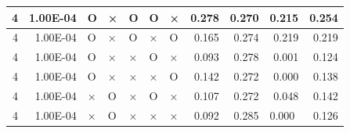 \documentclass[11pt]{article}
\begin{document}
\begin{longtable}[h]{|r|r|l|l|l|l|l|r|r|l|r|}
4                                 & 1.00E-04                         & O                                & ×                                & O                                & O                                & ×                                 & 0.278                             & 0.270                             & \multicolumn{1}{r|}{0.215}         & 0.254                               \\ \hline
4                                 & 1.00E-04                         & O                                & ×                                & O                                & ×                                & O                                 & 0.165                             & 0.274                             & \multicolumn{1}{r|}{0.219}         & 0.219                               \\ \hline
4                                 & 1.00E-04                         & O                                & ×                                & ×                                & O                                & ×                                 & 0.093                             & 0.278                             & \multicolumn{1}{r|}{0.001}         & 0.124                               \\ \hline
4                                 & 1.00E-04                         & O                                & ×                                & ×                                & ×                                & O                                 & 0.142                             & 0.272                             & \multicolumn{1}{r|}{0.000}         & 0.138                               \\ \hline
4                                 & 1.00E-04                         & ×                                & O                                & ×                                & O                                & ×                                 & 0.107                             & 0.272                             & \multicolumn{1}{r|}{0.048}         & 0.142                               \\ \hline
4                                 & 1.00E-04                         & ×                                & O                                & ×                                & ×                                & ×                                 & 0.092                             & 0.285                             & 0.000                              & 0.126                               \\ \hline

\end{longtable}
\end{document}
